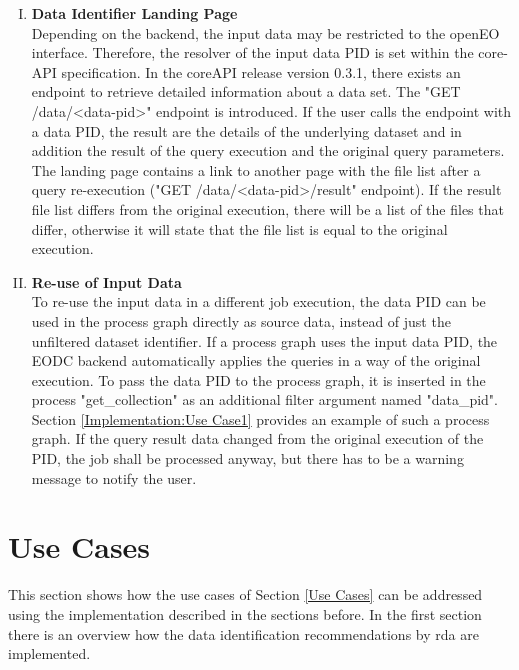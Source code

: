 \documentclass[draft,final]{vutinfth} %
\begin{document}
\begin{enumerate}[I.]
\item \textbf{Data Identifier Landing Page} \\
	Depending on the backend, the input data may be restricted to the openEO interface. Therefore, the resolver of the input data PID is set within the core-API specification. In the coreAPI release version 0.3.1, there exists an endpoint to retrieve detailed information about a data set. The "GET /data/<data-pid>" endpoint is introduced. If the user calls the endpoint with a data PID, the result are the details of the underlying dataset and in addition the result of the query execution and the original query parameters. The landing page contains a link to another page with the file list after a query re-execution ("GET /data/<data-pid>/result" endpoint). If the result file list differs from the original execution, there will be a list of the files that differ, otherwise it will state that the file list is equal to the original execution. 

\item \textbf{Re-use of Input Data} \\
	To re-use the input data in a different job execution, the data PID can be used in the process graph directly as source data, instead of just the unfiltered dataset identifier. If a process graph uses the input data PID, the EODC backend automatically applies the queries in a way of the original execution. To pass the data PID to the process graph, it is inserted in the process "get\_collection" as an additional filter argument named "data\_pid". Section \ref{Implementation:Use Case1} provides an example of such a process graph. If the query result data changed from the original execution of the PID, the job shall be processed anyway, but there has to be a warning message to notify the user.  
\end{enumerate}
\section{Use Cases}
This section shows how the use cases of Section \ref{Use Cases} can be addressed using the implementation described in the sections before. In the first section there is an overview how the data identification recommendations by \acrshort{rda} are implemented. 
\end{document}
